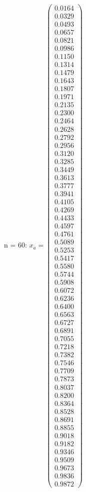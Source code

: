 \documentclass{udpreport}
\begin{document}
\begin{enumerate}
\begin{enumerate}
{{{{\begin{itemize}
\begin{itemize}
				n = 60: $x_{a} =\left(\begin{array}{c} 0.0164\\ 0.0329\\ 0.0493\\ 0.0657\\ 0.0821\\ 0.0986\\ 0.1150\\ 0.1314\\ 0.1479\\ 0.1643\\ 0.1807\\ 0.1971\\ 0.2135\\ 0.2300\\ 0.2464\\ 0.2628\\ 0.2792\\ 0.2956\\ 0.3120\\ 0.3285\\ 0.3449\\ 0.3613\\ 0.3777\\ 0.3941\\ 0.4105\\ 0.4269\\ 0.4433\\ 0.4597\\ 0.4761\\ 0.5089\\ 0.5253\\ 0.5417\\ 0.5580\\ 0.5744\\ 0.5908\\ 0.6072\\ 0.6236\\ 0.6400\\ 0.6563\\ 0.6727\\ 0.6891\\ 0.7055\\ 0.7218\\ 0.7382\\ 0.7546\\ 0.7709\\ 0.7873\\ 0.8037\\ 0.8200\\ 0.8364\\ 0.8528\\ 0.8691\\ 0.8855\\ 0.9018\\ 0.9182\\ 0.9346\\ 0.9509\\ 0.9673\\ 0.9836\\ 0.9872 \end{array}\right)$

\end{itemize}
\end{itemize}}}}}
\end{enumerate}
\end{enumerate}
\end{document}
